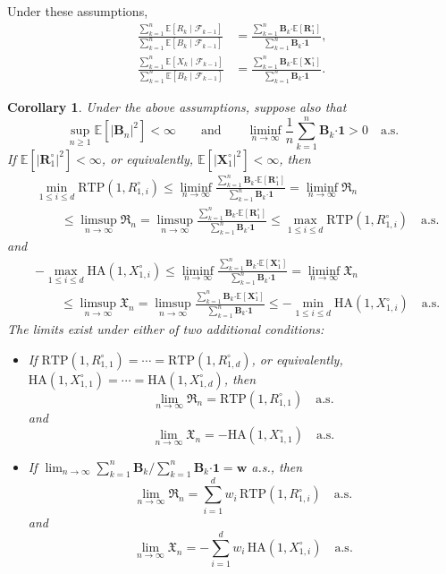 \documentclass{article}
\newtheorem{corollary}[theorem]{Corollary}
\theoremstyle{definition}
\theoremstyle{remark}
\newcommand{\E}{\mathbb{E}}
\newcommand{\F}{\mathscr{F}}
\newcommand{\RTP}{\mathrm{RTP}}
\newcommand{\HA}{\mathrm{HA}}
\begin{document}
Under these assumptions,
\begin{align*}
\frac{\sum_{k=1}^n \E[R_k\mid\F_{k-1}]}{\sum_{k=1}^n \E[B_k\mid\F_{k-1}]}&=\frac{\sum_{k=1}^n \bm B_k\bm\cdot\E[\bm R_1^\circ]}{\sum_{k=1}^n \bm B_k\bm\cdot\bm1},\\
\frac{\sum_{k=1}^n \E[X_k\mid\F_{k-1}]}{\sum_{k=1}^n \E[B_k\mid\F_{k-1}]}&=\frac{\sum_{k=1}^n \bm B_k\bm\cdot\E[\bm X_1^\circ]}{\sum_{k=1}^n \bm B_k\bm\cdot\bm1}.
\end{align*}


\begin{corollary}\label{cor:multiple_bets}
Under the above assumptions, suppose also that 
\[
\sup_{n \ge 1} \E[|\bm B_n|^2] < \infty\qquad\text{and}\qquad\liminf_{n\to\infty}\frac{1}{n}\sum_{k=1}^n \bm B_k\bm\cdot\bm1>0\quad\text{a.s.}
\]
If $\E[|\bm R_1^\circ|^2] < \infty$, or equivalently, $\E[|\bm X_1^\circ|^2] < \infty$, then
\begin{align*}
&\min_{1\le i \le d}\RTP(1,R_{1,i}^\circ)\le\liminf_{n\to\infty}\frac{\sum_{k=1}^n \bm B_k\bm\cdot\E[\bm R_1^\circ]}{\sum_{k=1}^n \bm B_k\bm\cdot\bm1}=\liminf_{n\to\infty}\mathfrak{R}_n\\
&\qquad\le\limsup_{n\to\infty}\mathfrak{R}_n=\limsup_{n\to\infty}\frac{\sum_{k=1}^n \bm B_k\bm\cdot\E[\bm R_1^\circ]}{\sum_{k=1}^n \bm B_k\bm\cdot\bm1}\le\max_{1\le i \le d}\RTP(1,R_{1,i}^\circ)\quad\text{a.s.}
\end{align*}
and
\begin{align*}
&-\max_{1\le i \le d}\HA(1,X_{1,i}^\circ)\le\liminf_{n\to\infty}\frac{\sum_{k=1}^n \bm B_k\bm\cdot\E[\bm X_1^\circ]}{\sum_{k=1}^n \bm B_k\bm\cdot\bm1}=\liminf_{n\to\infty}\mathfrak{X}_n\\
&\qquad\le\limsup_{n\to\infty}\mathfrak{X}_n=\limsup_{n\to\infty}\frac{\sum_{k=1}^n \bm B_k\bm\cdot\E[\bm X_1^\circ]}{\sum_{k=1}^n \bm B_k\bm\cdot\bm1}\le-\min_{1\le i \le d}\HA(1,X_{1,i}^\circ)\quad\text{a.s.}
\end{align*}
The limits exist under either of two additional conditions: 
\begin{itemize}
    \item If $\RTP(1,R_{1,1}^\circ)=\cdots=\RTP(1,R_{1,d}^\circ)$, or equivalently, $\HA(1,X_{1,1}^\circ)=\cdots=\HA(1,X_{1,d}^\circ)$, then
\[
\lim_{n\to\infty}\mathfrak{R}_n=\RTP(1,R_{1,1}^\circ)\quad\text{a.s.}
\]
and 
\[
\lim_{n\to\infty}\mathfrak{X}_n=-\HA(1,X_{1,1}^\circ)\quad\text{a.s.}
\]
\item If $\lim_{n\to\infty}\sum_{k=1}^n \bm B_k/\sum_{k=1}^n \bm B_k\bm\cdot\bm1=\bm w$ a.s., then
\[
\lim_{n\to\infty}\mathfrak{R}_n=\sum_{i=1}^d w_i\,\RTP(1,R_{1,i}^\circ)\quad\text{a.s.}
\]
and
\[
\lim_{n\to\infty}\mathfrak{X}_n=-\sum_{i=1}^d w_i\,\HA(1,X_{1,i}^\circ)\quad\text{a.s.}
\]
\end{itemize}
\end{corollary}
\end{document}
